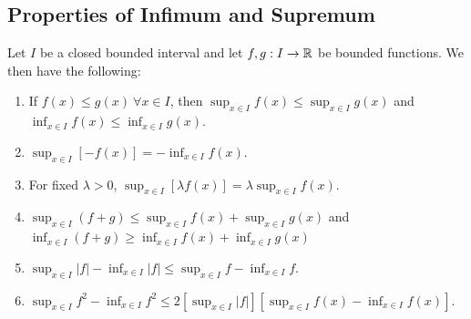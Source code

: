 \documentclass[../main.tex]{subfiles}
\begin{document}
\subsection{Properties of Infimum and Supremum}
\begin{lemma}
  Let $I$ be a closed bounded interval and let $f, g: I \to \mathbb{R}$ be bounded functions.
  We then have the following: \label{infSupProperties}
  \begin{enumerate}
    \item If $f(x) \leq g(x)\ \forall x \in I$, then $\sup_{x \in I} f(x) \leq \sup_{x \in I} g(x)$ and $\inf_{x \in I} f(x) \leq \inf_{x \in I} g(x)$.
    \item $\sup_{x \in I} [-f(x)] = - \inf_{x \in I} f(x)$.
    \item For fixed $\lambda > 0$, $\sup_{x \in I} [\lambda f(x)] = \lambda \sup_{x \in I} f(x)$.
    \item $\sup_{x \in I} (f + g) \leq \sup_{x \in I} f(x) + \sup_{x \in I} g(x)$ and $\inf_{x \in I} (f + g) \geq \inf_{x \in I} f(x) + \inf_{x \in I} g(x)$ \item $\sup_{x \in I} |f| - \inf_{x \in I} |f| \leq \sup_{x \in I} f - \inf_{x \in I} f$.
  \item $\sup_{x \in I} f^2 - \inf_{x \in I} f^2 \leq 2 [\sup_{x \in I} |f|][\sup_{x \in I} f(x) - \inf_{x \in I} f(x)]$.
  \end{enumerate}
\end{lemma}
\end{document}
